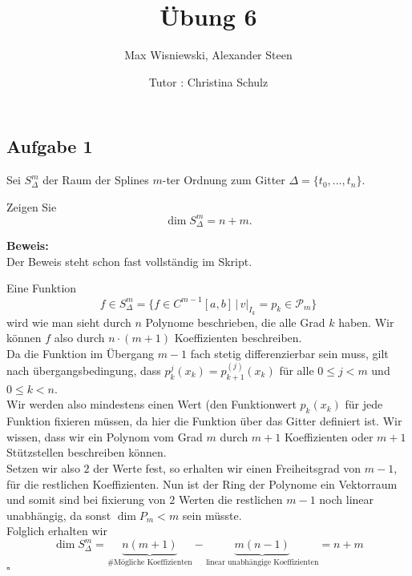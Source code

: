\documentclass[11pt,a4paper,ngerman]{article}
\date{Tutor : Christina Schulz}
\title{Übung 6}
\author{Max Wisniewski, Alexander Steen}
\begin{document}

\renewcommand{\figurename}{Figure}

\maketitle
\thispagestyle{fancy}

\subsection*{Aufgabe 1}

Sei $S_\Delta^m$ der Raum der Splines $m$-ter Ordnung zum Gitter $\Delta = \{ t_0 , ..., t_n \}$.

Zeigen Sie
\begin{equation*}
    \dim S_\Delta^m = n + m.
\end{equation*}

\textbf{Beweis:}\\

Der Beweis steht schon fast vollständig im Skript.

Eine Funktion
\begin{equation*}
    f \in S_\Delta^m = \{ f \in C^{m-1}[a,b] \, | \, v|_{I_k} = p_k \in \mathcal{P}_m\}
\end{equation*}
wird wie man sieht durch $n$ Polynome beschrieben, die alle Grad $k$ haben.
Wir können $f$ also durch $n \cdot (m+1)$ Koeffizienten beschreiben.\\

Da die Funktion im Übergang $m-1$ fach stetig differenzierbar sein muss, gilt nach übergangsbedingung,
dass $p_k^j(x_k) = p_{k+1}^(j)(x_k)$ für alle $0 \leq j < m$ und $0 \leq k < n$.\\

Wir werden also mindestens einen Wert (den Funktionwert $p_k(x_k)$ für jede Funktion fixieren müssen,
da hier die Funktion über das Gitter definiert ist. Wir wissen, dass wir ein Polynom vom Grad $m$ durch
$m+1$ Koeffizienten oder $m+1$ Stützstellen beschreiben können.\\

Setzen wir also $2$ der Werte fest, so erhalten wir einen Freiheitsgrad von $m-1$, für die restlichen
Koeffizienten. Nun ist der Ring der Polynome ein Vektorraum und somit sind bei fixierung von $2$ Werten
die restlichen $m-1$ noch linear unabhängig, da sonst $\dim P_m < m$ sein müsste.\\

Folglich erhalten wir
\begin{equation*}
    \dim S_\Delta^m = \underbrace{n(m+1)}_\text{\#Mögliche Koeffizienten} - \underbrace{m(n-1)}_\text{linear unabhängige Koeffizienten} = n + m
\end{equation*}
\mbox{}\hfill$\square$
\label{LastPage}
\end{document}
